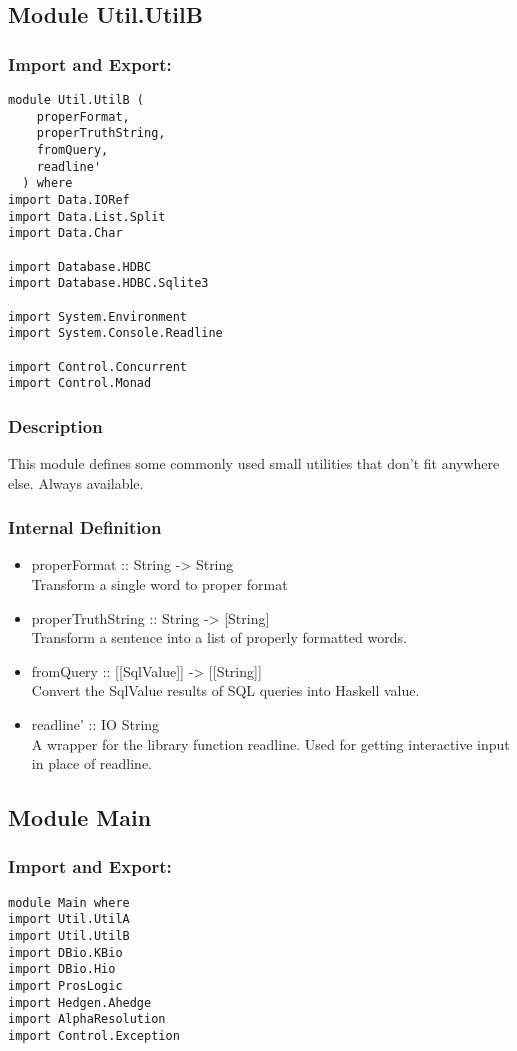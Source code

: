 \documentclass[../gr-final.tex]{subfiles}
\begin{document}
\subsection{Module Util.UtilB}
\subsubsection{Import and Export:}
\begin{lstlisting}
module Util.UtilB (
    properFormat,
    properTruthString,
    fromQuery,
    readline'
  ) where
import Data.IORef
import Data.List.Split
import Data.Char

import Database.HDBC
import Database.HDBC.Sqlite3

import System.Environment
import System.Console.Readline

import Control.Concurrent
import Control.Monad
\end{lstlisting}
\subsubsection{Description}
This module defines some commonly used small utilities that don't
fit anywhere else. Always available.
\subsubsection{Internal Definition}
\begin{itemize}
\item properFormat :: String -> String\\
        Transform a single word to proper format
\item properTruthString :: String -> [String]\\
        Transform a sentence into a list of properly formatted
        words.
\item fromQuery :: [[SqlValue]] -> [[String]]\\
        Convert the SqlValue results of SQL queries into Haskell
        value.
\item readline' :: IO String\\
        A wrapper for the library function readline. Used
        for getting interactive input in place of readline.
\end{itemize}
\subsection{Module Main}
\subsubsection{Import and Export:}
\begin{lstlisting}
module Main where
import Util.UtilA
import Util.UtilB
import DBio.KBio
import DBio.Hio
import ProsLogic
import Hedgen.Ahedge
import AlphaResolution
import Control.Exception
\end{lstlisting}
\end{document}
